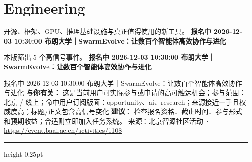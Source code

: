 \documentclass[10.5pt]{ctexart}
\begin{document}
\section*{Engineering}
{\color{ormuted} 开源、框架、GPU、推理基础设施与真正值得使用的新工具。}
\vspace{2mm}
{\LARGE\bfseries 报名中 2026-12-03 10:30:00 布朗大学｜SwarmEvolve：让数百个智能体高效协作与进化}\par
\vspace{1mm}
{\color{ormuted} 本版筛出 5 个高信号事件。}
\vspace{3mm}
{\Large\bfseries 报名中 2026-12-03 10:30:00 布朗大学｜SwarmEvolve：让数百个智能体高效协作与进化}\par
报名中 2026-12-03 10:30:00 布朗大学｜SwarmEvolve：让数百个智能体高效协作与进化
\textbf{与你有关：} 这是当前用户可实际参与或申请的高可触达机会；参与范围：北京 / 线上；命中用户订阅版面：opportunity、ai、research；来源接近一手且权威度高；标题/正文包含高信号变化
\textbf{建议：} 检查报名资格、截止时间、参与形式和预期收益；合适则立即加入任务系统。
{\footnotesize\color{ormuted} 来源：北京智源社区活动 · \url{https://event.baai.ac.cn/activities/1108}}
\vspace{4mm}
\hrule height 0.25pt
\vspace{3mm}
\end{document}
